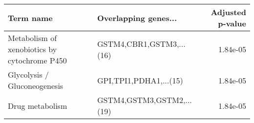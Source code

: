\begin{tabular}{llr}
\toprule
                                   Term name &      Overlapping genes... &  Adjusted p-value \\
\midrule
Metabolism of xenobiotics by cytochrome P450 &  GSTM4,CBR1,GSTM3,...(16) &          1.84e-05 \\
                Glycolysis / Gluconeogenesis &    GPI,TPI1,PDHA1,...(15) &          1.84e-05 \\
                             Drug metabolism & GSTM4,GSTM3,GSTM2,...(19) &          1.84e-05 \\
\bottomrule
\end{tabular}
